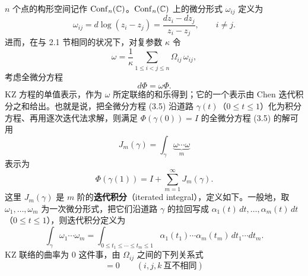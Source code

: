 $n$ 个点的构形空间记作 $\operatorname{Conf}_n(\mathbb{C})$。$\operatorname{Conf}_n(\mathbb{C})$ 上的微分形式 $\omega_{ij}$ 定义为
\[
  \omega_{ij}=d\log(z_i-z_j)=\frac{dz_i-dz_j}{z_i-z_j},\qquad i\ne j .
\]
进而，在与 2.1 节相同的状况下，对复参数 $\kappa$ 令
\[
  \omega=\frac{1}{\kappa}\sum_{1\le i<j\le n}\Omega_{ij}\,\omega_{ij},
\]
考虑全微分方程
\begin{equation}
  d\Phi=\omega\Phi . \tag{3.5}
\end{equation}
KZ 方程的单值表示，作为 $\omega$ 所定联络的和乐得到；它的一个表示由 Chen 迭代积分之和给出。也就是说，把全微分方程 (3.5) 沿道路 $\gamma(t)$（$0\le t\le 1$）化为积分方程、再用逐次迭代法求解，则满足 $\Phi(\gamma(0))=I$ 的全微分方程 (3.5) 的解可用
\begin{equation}
  J_m(\gamma)=\int_{\gamma}\underbrace{\omega\cdots\omega}_{m} \tag{3.6}
\end{equation}
表示为
\begin{equation}
  \Phi(\gamma(1))=I+\sum_{m=1}^{\infty}J_m(\gamma). \tag{3.7}
\end{equation}
这里 $J_m(\gamma)$ 是 $m$ 阶的\textbf{迭代积分}（iterated integral），定义如下。一般地，取 $\omega_1,\dots,\omega_m$ 为一次微分形式，把它们沿道路 $\gamma$ 的拉回写成 $\alpha_1(t)\,dt,\dots,\alpha_m(t)\,dt$（$0\le t\le1$），则迭代积分定义为
\begin{equation}
  \int_{\gamma}\omega_1\cdots\omega_m
  =\int_{0\le t_1\le\cdots\le t_m\le 1}
  \alpha_1(t_1)\cdots\alpha_m(t_m)\,dt_1\cdots dt_m . \tag{3.8}
\end{equation}
KZ 联络的曲率为 $0$ 这件事，由 $\Omega_{ij}$ 之间的下列关系式
\begin{equation}
  [\Omega_{ij}+\Omega_{jk},\,\Omega_{ik}]=0
  \qquad (i,j,k\ \text{互不相同}) \tag{3.9}
\end{equation}

